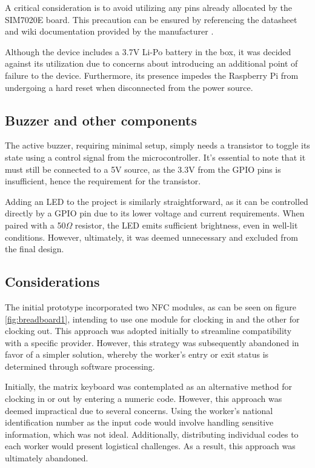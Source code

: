 A critical consideration is to avoid utilizing any pins already allocated by the SIM7020E board. This precaution can be 
ensured by referencing the datasheet and wiki documentation provided by the manufacturer \cite{sim7020e_wiki}.

Although the device includes a 3.7V Li-Po battery in the box, it was decided against its utilization due to concerns about 
introducing an additional point of failure to the device. Furthermore, its presence impedes the Raspberry Pi from undergoing 
a hard reset when disconnected from the power source.


\subsection{Buzzer and other components}

The active buzzer, requiring minimal setup, simply needs a transistor to toggle its state using a control signal from the 
microcontroller. It's essential to note that it must still be connected to a 5V source, as the 3.3V from the GPIO pins is 
insufficient, hence the requirement for the transistor.

Adding an LED to the project is similarly straightforward, as it can be controlled directly by a GPIO pin due to its lower 
voltage and current requirements. When paired with a 50$\Omega$ resistor, the LED emits sufficient brightness, even in 
well-lit conditions. However, ultimately, it was deemed unnecessary and excluded from the final design.


\subsection{Considerations}

The initial prototype incorporated two NFC modules, as can be seen on figure \ref{fig:breadboard1}, intending to use one 
module for clocking in and the other for clocking out. This approach was adopted initially to streamline compatibility 
with a specific provider. However, this strategy was subsequently abandoned in favor of a simpler solution, whereby the 
worker's entry or exit status is determined through software processing.

Initially, the matrix keyboard was contemplated as an alternative method for clocking in or out by entering a numeric 
code. However, this approach was deemed impractical due to several concerns. Using the worker's national identification 
number as the input code would involve handling sensitive information, which was not ideal. Additionally, distributing 
individual codes to each worker would present logistical challenges. As a result, this approach was ultimately abandoned.


